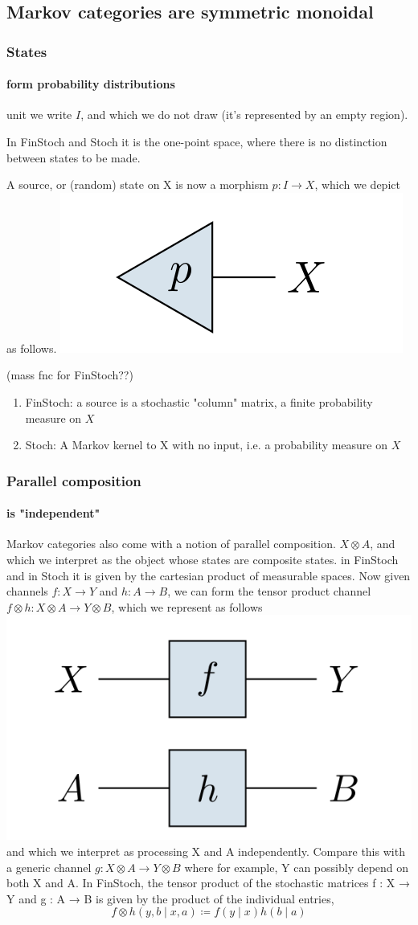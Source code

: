 \subsection{Markov categories are symmetric monoidal}
\begin{frame}
    \frametitle{States}
    \framesubtitle{form probability distributions}
unit we write $I$, and which we do not draw (it’s represented by an empty region). 

In FinStoch and Stoch it is the one-point space, where there is no distinction between states to be made.

A source, or (random) state on X is now a morphism $p: I\to X$, which we depict as follows.
\includegraphics[width=.4\textwidth]{graphics/string/markov_state.png}

(mass fnc for FinStoch??)
\begin{enumerate}
    \item FinStoch: a source is a stochastic "column" matrix, a finite probability measure on $X$
    \item Stoch: A Markov kernel to X with no input, i.e. a probability measure on $X$
\end{enumerate}

\end{frame}

\begin{frame}
    \frametitle{Parallel composition} 
    \framesubtitle{is "independent"}
Markov categories also come with a notion of parallel composition. $X\otimes A$, and which we interpret as the object whose states are composite states. in FinStoch and in Stoch it is given by the cartesian product of measurable spaces. Now given channels $f: X\to Y$ and $h: A\to B$, we can form the tensor product channel $f\otimes h: X\otimes A\to Y\otimes B$, which we represent as follows
\includegraphics[width=.4\textwidth]{graphics/string/markov_parallel.png}
and which we interpret as processing X and A independently. Compare this with a generic channel $g: X\otimes A\to Y\otimes B$
where for example, Y can possibly depend on both X and A. In FinStoch, the tensor product of the stochastic matrices f : X → Y and g : A → B is given by the product of the individual entries,
\[
    f\otimes h(y, b\mid x, a)\coloneqq f(y\mid x)h(b\mid a)
\]
\end{frame}

